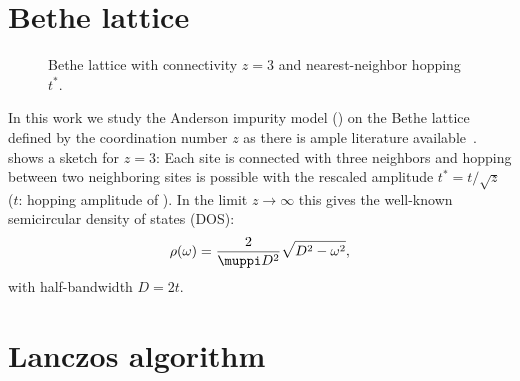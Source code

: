 \section{Bethe lattice}%
\label{sec:bethe-lattice}

\begin{figure}[ht]
    \centering
    
    \caption{
        Bethe lattice with connectivity $z=3$ and nearest-neighbor hopping $t^*$.
    }%
    \label{fig:bethe-lattice}
\end{figure}

In this work we study the Anderson impurity model ()
on the Bethe lattice defined by the coordination number $z$
as there is ample literature available~\cite{Georges1996}.
 shows a sketch for $z=3$:
Each site is connected with three neighbors and hopping between two neighboring sites is possible
with the rescaled amplitude $t^* = t/\sqrt{z}$~\cite{Held2007}
($t$: hopping amplitude of ).
In the limit $z\to\infty$ this gives the well-known semicircular density of states (DOS):
\begin{equation}
    \rho(\omega) = \frac{2}{\muppi D^2} \sqrt{D^2 - \omega^2},
    \label{eq:dos-semicircle}
\end{equation}
with half-bandwidth $D=2t$.

\section{Lanczos algorithm}%
\label{sec:lanczos-algorithm}

